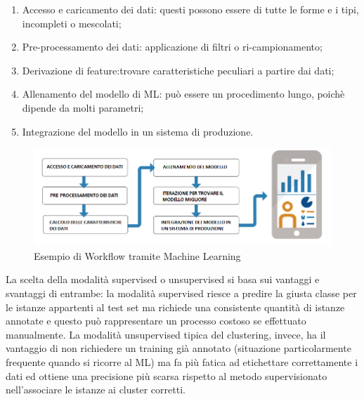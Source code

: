 \begin{enumerate}
	\item Accesso e caricamento dei dati: questi possono essere di tutte le forme e i tipi, incompleti o mescolati;
	\item Pre-processamento dei dati: applicazione di filtri o ri-campionamento;
	\item Derivazione di feature:trovare caratteristiche peculiari a partire dai dati;
	\item Allenamento del modello di ML: può essere un procedimento lungo, poichè dipende da molti parametri;
	\item Integrazione del modello in un sistema di produzione.
\end{enumerate}
\begin{figure}[]
	\centering
	\includegraphics[width=1\textwidth]{images/Workflow_ML.png}
	\caption{Esempio di Workflow tramite Machine Learning}
\end{figure}
La scelta della modalità supervised o unsupervised si basa sui vantaggi e svantaggi di entrambe: la modalità supervised riesce a predire la giusta classe per le istanze appartenti al test set ma richiede una consistente quantità di istanze annotate e questo può rappresentare un processo costoso se effettuato manualmente. La modalità unsupervised tipica del clustering, invece, ha il vantaggio di non richiedere un training già annotato (situazione particolarmente frequente quando si
ricorre al ML) ma fa più fatica ad etichettare correttamente i dati ed ottiene una precisione più scarsa rispetto al metodo supervisionato nell'associare le istanze ai cluster corretti. 

